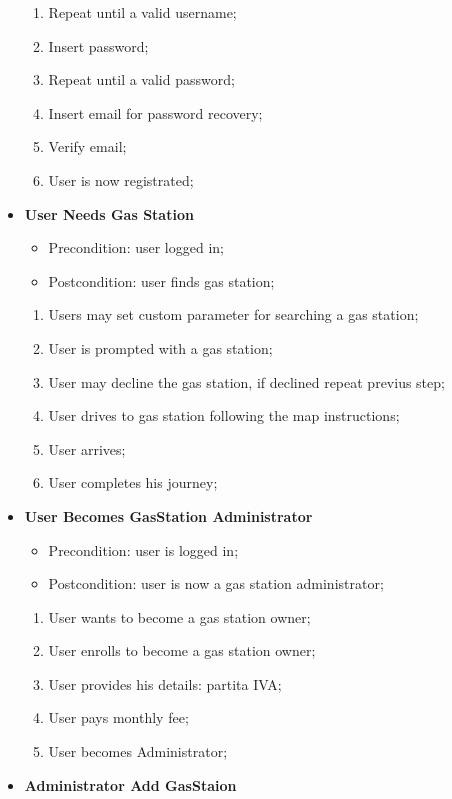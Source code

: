 \documentclass[12pt]{article}
\begin{document}
\begin{itemize}
\begin{enumerate}
      \item Repeat until a valid username;
      \item Insert password;
      \item Repeat until a valid password;
      \item Insert email for password recovery;
      \item Verify email;
      \item User is now registrated;
    \end{enumerate}
  \item \textbf{User Needs Gas Station}
    \begin{itemize}
      \item Precondition: user logged in;
      \item Postcondition: user finds gas station;
    \end{itemize}
    \begin{enumerate}
      \item Users may set custom parameter for searching a gas station;
      \item User is prompted with a gas station;
      \item User may decline the gas station, if declined repeat previus step;
      \item User drives to gas station following the map instructions;
      \item User arrives;
      \item User completes his journey;
    \end{enumerate}
  \item \textbf{User Becomes GasStation Administrator}
    \begin{itemize}
      \item Precondition: user is logged in;
      \item Postcondition: user is now a gas station administrator;
    \end{itemize}
    \begin{enumerate}
      \item User wants to become a gas station owner;
      \item User enrolls to become a gas station owner;
      \item User provides his details: partita IVA;
      \item User pays monthly fee;
      \item User becomes Administrator;
    \end{enumerate}
  \item \textbf{Administrator Add GasStaion}

\end{itemize}
\end{document}
